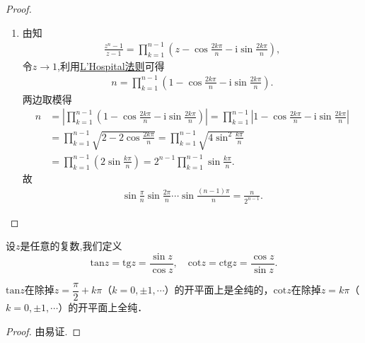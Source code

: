 \documentclass[../../main.tex]{subfiles}%
\begin{document}
\begin{proof}
\begin{enumerate}[(1)]
\item 由知
\begin{align*}
\frac{z^n-1}{z-1}=\prod_{k=1}^{n-1}{\left( z-\cos \frac{2k\pi}{n}-\mathrm{i}\sin \frac{2k\pi}{n} \right)},
\end{align*}
令$z\to 1$,利用\hyperref[theorem:L'Hospital(洛必达)法则]{L'Hospital法则}可得
\begin{align*}
n = \prod_{k=1}^{n-1}{\left( 1-\cos \frac{2k\pi}{n}-\mathrm{i}\sin \frac{2k\pi}{n} \right)}.
\end{align*}
两边取模得
\begin{align*}
n&=\left| \prod_{k=1}^{n-1}{\left( 1-\cos \frac{2k\pi}{n}-\mathrm{i}\sin \frac{2k\pi}{n} \right)} \right|=\prod_{k=1}^{n-1}{\left| 1-\cos \frac{2k\pi}{n}-\mathrm{i}\sin \frac{2k\pi}{n} \right|}
\\
&=\prod_{k=1}^{n-1}{\sqrt{2-2\cos \frac{2k\pi}{n}}}=\prod_{k=1}^{n-1}{\sqrt{4\sin ^2\frac{k\pi}{n}}}
\\
&=\prod_{k=1}^{n-1}{\left( 2\sin \frac{k\pi}{n} \right)}=2^{n-1}\prod_{k=1}^{n-1}{\sin \frac{k\pi}{n}}.
\end{align*}
故
\begin{align*}
\sin\frac{\pi}{n}\sin\frac{2\pi}{n}\cdots\sin\frac{(n-1)\pi}{n}=\frac{n}{2^{n-1}}.
\end{align*}

\end{enumerate}
\end{proof}

\begin{definition}
设$z$是任意的复数,我们定义
\[
\text{tan} z=\text{tg} z = \dfrac{\sin z}{\cos z},
\quad 
\text{cot} z=\text{ctg} z = \dfrac{\cos z}{\sin z}.
\]
\end{definition}

\begin{theorem}
$\text{tan} z$在除掉$z = \dfrac{\pi}{2} + k\pi$（$k = 0, \pm 1, \cdots$）的开平面上是全纯的，$\text{cot} z$在除掉$z = k\pi$（$k = 0, \pm 1, \cdots$）的开平面上全纯．
\end{theorem}
\begin{proof}
由易证.
\end{proof}
\end{document}
